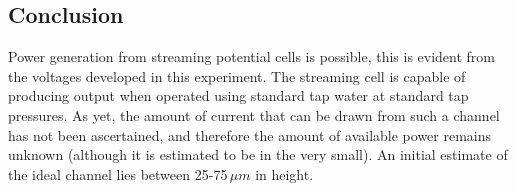 



\subsection{Conclusion}

Power generation from streaming potential cells is possible, this is evident
from the voltages developed in this experiment. The streaming cell is capable
of producing output when operated using standard tap water at standard tap
pressures. As yet, the amount of current that can be drawn from such a channel
has not been ascertained, and therefore the amount of available power remains
unknown (although it is estimated to be in the very small). An initial estimate
of the ideal channel lies between 25-75$\,\mu m$ in height.

